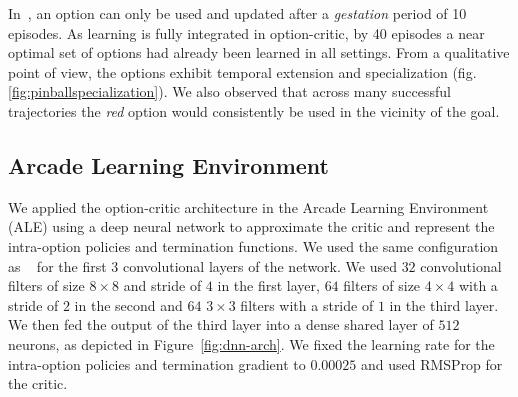 \documentclass[letterpaper]{article}
\begin{document}
In~\cite{Konidaris2009}, an option can only be used and updated
after a \textit{gestation} period of 10 episodes.
As learning is fully integrated in option-critic, by 40 episodes a near optimal
set of options had already been learned in all settings.
From a qualitative point
of view, the options exhibit temporal extension and specialization
(fig. \ref{fig:pinballspecialization}). We  also observed that
across many successful trajectories the \textit{red} option would consistently
be used in the vicinity of the goal.

\subsection{Arcade Learning Environment}
\label{sect:deep}

We applied the option-critic architecture in the Arcade Learning Environment
(ALE) \cite{bellemare13arcade} using a deep neural network
to approximate the critic and represent the intra-option policies and termination functions.
We used the same configuration as ~\cite{Mnih2013} for the first 3 convolutional
layers of the network.
We used $32$ convolutional filters of size $8 \times 8$
and stride of $4$ in the first layer, $64$ filters of size $4 \times 4$
with a stride of $2$ in the second and $64$ $3 \times 3$ filters with a
stride of $1$ in the third layer.
We then fed the output of the third layer
into a dense shared layer of $512$ neurons, as depicted in Figure~\ref{fig:dnn-arch}.
We fixed the learning rate for the
intra-option policies and termination gradient to $0.00025$ and used RMSProp for the critic.
\end{document}
